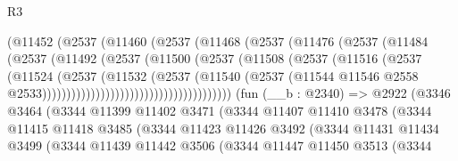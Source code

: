\begin{lexlean}{R3}
\begin{coremodule}
                                (@11452
                                  (@2537
                                    (@11460
                                      (@2537
                                        (@11468
                                          (@2537
                                            (@11476
                                              (@2537
                                                (@11484
                                                  (@2537
                                                    (@11492
                                                      (@2537
                                                        (@11500
                                                          (@2537
                                                            (@11508
                                                              (@2537
                                                                (@11516
                                                                  (@2537
                                                                    (@11524
                                                                      (@2537
                                                                        (@11532
                                                                          (@2537
                                                                            (@11540
                                                                              (@2537
                                                                                (@11544
                                                                                  @11546
                                                                                  @2558
                                                                                  @2533)))))))))))))))))))))))))))))))))))))))
    (fun (__b : @2340) =>
    @2922
      (@3346
        @3464
        (@3344
          @11399
          @11402
          @3471
          (@3344
            @11407
            @11410
            @3478
            (@3344
              @11415
              @11418
              @3485
              (@3344
                @11423
                @11426
                @3492
                (@3344
                  @11431
                  @11434
                  @3499
                  (@3344
                    @11439
                    @11442
                    @3506
                    (@3344
                      @11447
                      @11450
                      @3513
                      (@3344

\end{coremodule}
\end{lexlean}
